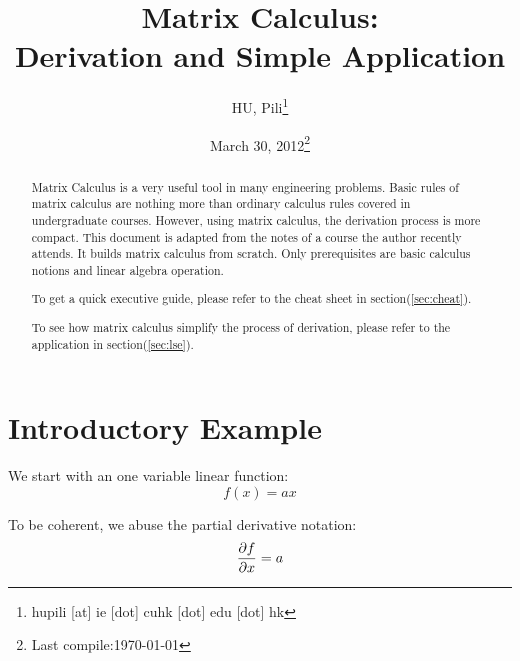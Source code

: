 



\author{HU, Pili\thanks{hupili [at] ie [dot] cuhk [dot] edu [dot] hk}}

\title{Matrix Calculus: \\ Derivation and Simple Application}
\date{March 30, 2012\thanks{Last compile:\today}}



\maketitle
\begin{abstract}
	Matrix Calculus\cite{wiki_mc} is a very useful tool in many 
	engineering problems. Basic rules of matrix calculus are 
	nothing more than ordinary calculus rules covered in 
	undergraduate courses. However, using matrix calculus, 
	the derivation process is more compact. This document is 
	adapted from the notes of a course the author recently attends.
	It builds matrix calculus from scratch. Only prerequisites 
	are basic calculus notions and linear algebra operation.  
	
	To get a quick executive guide, please refer to the cheat 
	sheet in section(\ref{sec:cheat}). 
	
	To see how matrix calculus simplify the process of derivation, please 
	refer to the application in section(\ref{sec:lse}). 
\end{abstract}

\pagebreak
\setcounter{tocdepth}{2}
\tableofcontents
\pagebreak

\section{Introductory Example}

We start with an one variable linear function:
\begin{equation}
	f(x) = ax
\end{equation}

To be coherent, we abuse the partial derivative notation:
\begin{equation}
	\dfrac{\partial f}{\partial x} = a
	\label{eq:fax-single}
\end{equation}

